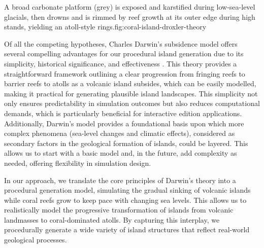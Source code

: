 \begin{Itemize}
    {A broad carbonate platform (grey) is exposed and karstified during low-sea-level glacials, then drowns and is rimmed by reef growth at its outer edge during high stands, yielding an atoll-style rings.}{fig:coral-island-droxler-theory}

\end{Itemize}

Of all the competing hypotheses, Charles Darwin's subsidence model offers several compelling advantages for our procedural island generation due to its simplicity, historical significance, and effectiveness \cite{Tomascik1997}. This theory provides a straightforward framework outlining a clear progression from fringing reefs to barrier reefs to atolls as a volcanic island subsides, which can be easily modelled, making it practical for generating plausible island landscapes. This simplicity not only ensures predictability in simulation outcomes but also reduces computational demands, which is particularly beneficial for interactive edition applications. Additionally, Darwin's model provides a foundational basis upon which more complex phenomena (sea-level changes and climatic effects), considered as secondary factors in the geological formation of islands, could be layered. This allows us to start with a basic model and, in the future, add complexity as needed, offering flexibility in simulation design.

In our approach, we translate the core principles of Darwin's theory into a procedural generation model, simulating the gradual sinking of volcanic islands while coral reefs grow to keep pace with changing sea levels. This allows us to realistically model the progressive transformation of islands from volcanic landmasses to coral-dominated atolls. By capturing this interplay, we procedurally generate a wide variety of island structures that reflect real-world geological processes.


